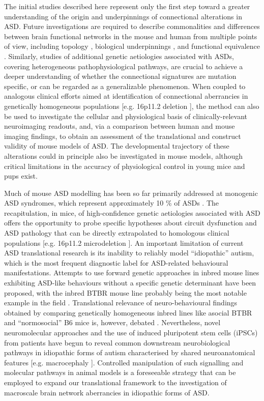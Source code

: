 The initial studies described here represent only the first step toward a
greater understanding of the origin and underpinnings of connectional
alterations in ASD. Future investigations are required to describe commonalities
and differences between brain functional networks in the mouse and human from
multiple points of view, including topology \parencite{sporns2016,
vandenheuvel2016a}, biological underpinnings \parencite{vandenheuvel2016,
richiardi2015, wang2015}, and functional equivalence \parencite{li2015}.
Similarly, studies of additional genetic aetiologies associated with ASDs,
covering heterogeneous pathophysiological pathways, are crucial to achieve a
deeper understanding of whether the connectional signatures are mutation
specific, or can be regarded as a generalizable phenomenon. When coupled to
analogous clinical efforts aimed at identification of connectional aberrancies
in genetically homogeneous populations [e.g. 16p11.2 deletion
\parencite{owen2014, simonsvipconsortium2012}], the method can also be used to
investigate the cellular and physiological basis of clinically-relevant
neuroimaging readouts, and, via a comparison between human and mouse imaging
findings, to obtain an assessment of the translational and construct validity of
mouse models of ASD. The developmental trajectory of these alterations could in
principle also be investigated in mouse models, although critical limitations in
the accuracy of physiological control in young mice and pups exist. 

Much of mouse ASD modelling has been so far primarily addressed at monogenic ASD
syndromes, which represent approximately 10 \% of ASDs \parencite{silverman2010,
nelson2015}. The recapitulation, in mice, of high-confidence genetic aetiologies
associated with ASD offers the opportunity to probe specific hypotheses about
circuit dysfunction and ASD pathology that can be directly extrapolated to
homologous clinical populations [e.g. 16p11.2 microdeletion \parencite{owen2014,
simonsvipconsortium2012}]. An important limitation of current ASD translational
research is its inability to reliably model “idiopathic” autism, which is the
most frequent diagnostic label for ASD-related behavioural manifestations.
Attempts to use forward genetic approaches in inbred mouse lines exhibiting
ASD-like behaviours without a specific genetic determinant have been proposed,
with the inbred BTBR mouse line probably being the most notable example in the
field \parencite{silverman2010, gogolla2014, squillace2014}. Translational
relevance of neuro-behavioural findings obtained by comparing genetically
homogeneous inbred lines like asocial BTBR and “normosocial” B6 mice is,
however, debated \parencite{dodero2013, squillace2014}. Nevertheless, novel
neuromolecular approaches and the use of induced pluripotent stem cells (iPSCs)
from patients have begun to reveal common downstream neurobiological pathways in
idiopathic forms of autism characterised by shared neuroanatomical features
[e.g. macrocephaly \parencite{marchetto2016, nicolini2015}]. Controlled
manipulation of such signalling and molecular pathways in animal models is a
foreseeable strategy that can be employed to expand our translational framework
to the investigation of macroscale brain network aberrancies in idiopathic forms
of ASD.

